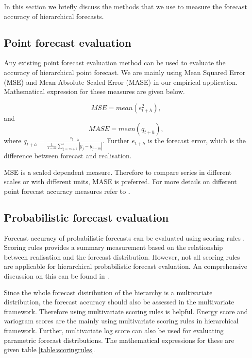 \documentclass[graybox]{svmult}
\begin{document}
In this section we briefly discuss the methods that we use to measure the forecast accuracy of hierarchical forecasts. 

\subsection{Point forecast evaluation}

Any existing point forecast evaluation method can be used to evaluate the accuracy of hierarchical point forecast. We are mainly using Mean Squared Error (MSE) and Mean Absolute Scaled Error (MASE) in our empirical application. Mathematical expression for these measures are given below. 

\begin{equation}\label{eq:22}
MSE = mean(e^2_{t+h}),
\end{equation}
and
\begin{equation}\label{eq:23}
 MASE = mean(q_{t+h}),
\end{equation}
where $q_{t+h} = \frac{e_{t+h}}{\frac{1}{T-m}\sum_{j=m+1}^{T}|y_j - y_{j-m}|}$. Further $e_{t+h}$ is the forecast error, which is the difference between forecast and realisation.

MSE is a scaled dependent measure. Therefore to compare series in different scales or with different units, MASE is preferred. For more details on different point forecast accuracy measures refer to \cite{hyndman2018forecasting}. 
  
\subsection{Probabilistic forecast evaluation}

Forecast accuracy of probabilistic forecasts can be evaluated using scoring rules \cite{Gneiting2014}. Scoring rules provides a summary measurement based on the relationship between realisation and the forecast distribution. However, not all scoring rules are applicable for hierarchical probabilistic forecast evaluation. An comprehensive discussion on this can be found in \cite{Gamakumara2018}.  

Since the whole forecast distribution of the hierarchy is a multivariate distribution, the forecast accuracy should also be assessed in the multivariate framework. Therefore using multivariate scoring rules is helpful. Energy score \citep{Gneiting2008} and variogram scores \citep{SCHEUERER2015} are the mainly using multivariate scoring rules in hierarchical framework. Further, multivariate log score \citep{Gneiting2007} can also be used for evaluating parametric forecast distributions. The mathematical expressions for these are given table \ref{table:scoringrules}. 
\end{document}
